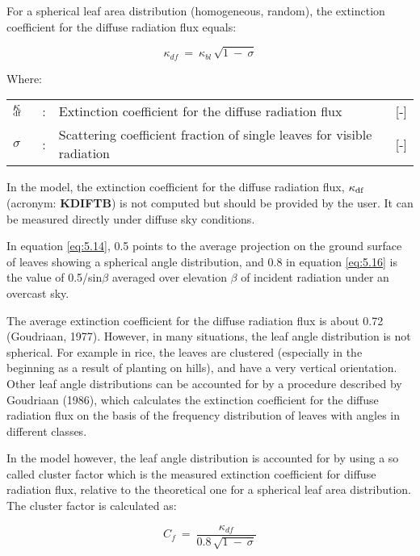 For a spherical leaf area distribution (homogeneous, random), the extinction coefficient
for the diffuse radiation flux equals:

\begin{equation}
\label{eq:5.15}
\kappa_{df} ~=~ \kappa_{bl} \, \sqrt{1~-~ \sigma }
\end{equation}

Where:\\[5pt]
\begin{tabularx}{\textwidth}{llXr}
	$\kappa$$_{{\rm df}}$ &:& Extinction coefficient for the diffuse radiation flux    &    [-]\\
	$\sigma$ &:& Scattering coefficient fraction of single leaves for 
	visible radiation    &    [-]\\
\end{tabularx}

In the model, the extinction coefficient for the diffuse radiation flux, {\bf $\kappa_{\rm df}$} (acronym: {\bf KDIFTB}) is not computed but should be provided by the user. It can be measured directly 
under diffuse sky conditions.

In equation \ref{eq:5.14}, 0.5 points to the average projection on the ground surface of leaves
showing a spherical angle distribution, and 0.8 in equation \ref{eq:5.16} is the value of 0.5/sin$\beta$
averaged over elevation $\beta$ of incident radiation under an overcast sky.

The average extinction coefficient for the diffuse radiation flux is about 0.72 (Goudriaan,
1977). However, in many situations, the leaf angle distribution is not spherical. For
example in rice, the leaves are clustered (especially in the beginning as a result of
planting on hills), and have a very vertical orientation. Other leaf angle distributions can
be accounted for by a procedure described by Goudriaan (1986), which calculates the
extinction coefficient for the diffuse radiation flux on the basis of the frequency 
distribution of leaves with angles in different classes.

In the model however, the leaf angle distribution is accounted for by using a so called
cluster factor which is the measured extinction coefficient for diffuse radiation flux,
relative to the theoretical one for a spherical leaf area distribution. The cluster factor is
calculated as: 

\begin{equation}
\label{eq:5.16}
C _{f} ~=~{\frac{ \kappa _{df} }{0.8\, \sqrt{1 ~-~ \sigma } }}
\end{equation}

